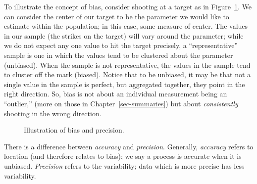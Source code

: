 \documentclass[
  letterpaper,
  DIV=11,
  numbers=noendperiod]{scrreprt}
\theoremstyle{definition}
\theoremstyle{definition}
\theoremstyle{plain}
\theoremstyle{remark}
\begin{document}
To illustrate the concept of bias, consider shooting at a target as in
Figure~\ref{fig-data-bias}. We can consider the center of our target to
be the parameter we would like to estimate within the population; in
this case, some measure of center. The values in our sample (the strikes
on the target) will vary around the parameter; while we do not expect
any one value to hit the target precisely, a ``representative'' sample
is one in which the values tend to be clustered about the parameter
(unbiased). When the sample is not representative, the values in the
sample tend to cluster off the mark (biased). Notice that to be
unbiased, it may be that not a single value in the sample is perfect,
but aggregated together, they point in the right direction. So, bias is
not about an individual measurement being an ``outlier,'' (more on those
in Chapter~\ref{sec-summaries}) but about \emph{consistently} shooting
in the wrong direction.

\begin{figure}


\caption{\label{fig-data-bias}Illustration of bias and precision.}

\end{figure}%

\begin{tcolorbox}[enhanced jigsaw, colbacktitle=quarto-callout-warning-color!10!white, colback=white, left=2mm, title=\textcolor{quarto-callout-warning-color}{\faExclamationTriangle}\hspace{0.5em}{Accuracy vs.~Precision}, toptitle=1mm, leftrule=.75mm, breakable, bottomrule=.15mm, arc=.35mm, rightrule=.15mm, toprule=.15mm, coltitle=black, opacityback=0, colframe=quarto-callout-warning-color-frame, opacitybacktitle=0.6, bottomtitle=1mm, titlerule=0mm]

There is a difference between \emph{accuracy} and \emph{precision}.
Generally, \emph{accuracy} refers to location (and therefore relates to
bias); we say a process is accurate when it is unbiased.
\emph{Precision} refers to the variability; data which is more precise
has less variability.

\end{tcolorbox}
\end{document}
